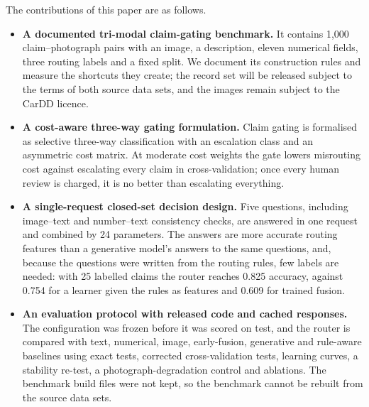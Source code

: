 The contributions of this paper are as follows.
\begin{itemize}
\item \textbf{A documented tri-modal claim-gating benchmark.} It contains 1,000 claim--photograph pairs with an image, a description, eleven numerical fields, three routing labels and a fixed split. We document its construction rules and measure the shortcuts they create; the record set will be released subject to the terms of both source data sets, and the images remain subject to the CarDD licence.
\item \textbf{A cost-aware three-way gating formulation.} Claim gating is formalised as selective three-way classification with an escalation class and an asymmetric cost matrix. At moderate cost weights the gate lowers misrouting cost against escalating every claim in cross-validation; once every human review is charged, it is no better than escalating everything.
\item \textbf{A single-request closed-set decision design.} Five questions, including image--text and number--text consistency checks, are answered in one request and combined by 24 parameters. The answers are more accurate routing features than a generative model's answers to the same questions, and, because the questions were written from the routing rules, few labels are needed: with 25 labelled claims the router reaches 0.825 accuracy, against 0.754 for a learner given the rules as features and 0.609 for trained fusion.
\item \textbf{An evaluation protocol with released code and cached responses.} The configuration was frozen before it was scored on test, and the router is compared with text, numerical, image, early-fusion, generative and rule-aware baselines using exact tests, corrected cross-validation tests, learning curves, a stability re-test, a photograph-degradation control and ablations. The benchmark build files were not kept, so the benchmark cannot be rebuilt from the source data sets.
\end{itemize}
